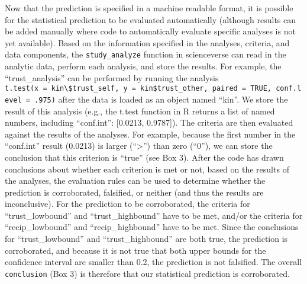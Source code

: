 \documentclass[english,doc,floatsintext]{apa6}
\begin{document}
Now that the prediction is specified in a machine readable format, it is possible for the statistical prediction to be evaluated automatically (although results can be added manually where code to automatically evaluate specific analyses is not yet available). Based on the information specified in the analyses, criteria, and data components, the \texttt{study\_analyze} function in scienceverse can read in the analytic data, perform each analysis, and store the results. For example, the \enquote{trust\_analysis} can be performed by running the analysis \texttt{t.test(x\ =\ kin\textbackslash{}\$trust\_self,\ y\ =\ kin\$trust\_other,\ paired\ =\ TRUE,\ conf.level\ =\ .975)} after the data is loaded as an object named \enquote{kin}. We store the result of this analysis (e.g., the t.test function in R returns a list of named numbers, including \enquote{conf.int}: {[}0.0213, 0.9787{]}). The criteria are then evaluated against the results of the analyses. For example, because the first number in the \enquote{conf.int} result (0.0213) is larger (\enquote{\textgreater{}}) than zero (\enquote{0}), we can store the conclusion that this criterion is \enquote{true} (see Box 3). After the code has drawn conclusions about whether each criterion is met or not, based on the results of the analyses, the evaluation rules can be used to determine whether the prediction is corroborated, falsified, or neither (and thus the results are inconclusive). For the prediction to be corroborated, the criteria for \enquote{trust\_lowbound} and \enquote{trust\_highbound} have to be met, and/or the criteria for \enquote{recip\_lowbound} and \enquote{recip\_highbound} have to be met. Since the conclusions for \enquote{trust\_lowbound} and \enquote{trust\_highbound} are both true, the prediction is corroborated, and because it is not true that both upper bounds for the confidence interval are smaller than 0.2, the prediction is not falsified. The overall \texttt{conclusion} (Box 3) is therefore that our statistical prediction is corroborated.
\end{document}
